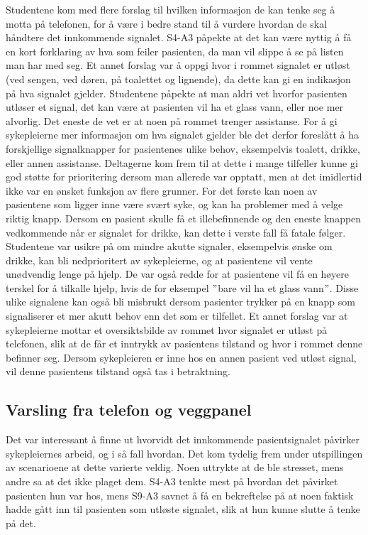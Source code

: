 \noindent
Studentene kom med flere forslag til hvilken informasjon de kan tenke seg å motta på telefonen, for å være i bedre stand til å vurdere hvordan de skal håndtere det innkommende signalet. S4-A3 påpekte at det kan være nyttig å få en kort forklaring av hva som feiler pasienten, da man vil slippe å se på listen man har med seg. Et annet forslag var å oppgi hvor i rommet signalet er utløst (ved sengen, ved døren, på toalettet og lignende), da dette kan gi en indikasjon på hva signalet gjelder. Studentene påpekte at man aldri vet hvorfor pasienten utløser et signal, det kan være at pasienten vil ha et glass vann, eller noe mer alvorlig. Det eneste de vet er at noen på rommet trenger assistanse. For å gi sykepleierne mer informasjon om hva signalet gjelder ble det derfor foreslått å ha forskjellige signalknapper for pasientenes ulike behov, eksempelvis toalett, drikke, eller annen assistanse. Deltagerne kom  frem til at dette i mange tilfeller kunne gi god støtte for prioritering dersom man allerede var opptatt, men at det imidlertid ikke var en ønsket funksjon av flere grunner. For det første kan noen av pasientene som ligger inne være svært syke, og kan ha problemer med å velge riktig knapp. Dersom en pasient skulle få et illebefinnende og den eneste knappen vedkommende når er signalet for drikke, kan dette i verste fall få fatale følger. Studentene var usikre på om mindre akutte signaler, eksempelvis ønske om drikke, kan bli nedprioritert av sykepleierne, og at pasientene vil  vente unødvendig lenge på hjelp. De var også redde for at pasientene vil få en høyere terskel for å tilkalle hjelp, hvis de for eksempel $"$bare vil ha et glass vann$"$. Disse ulike signalene kan også bli misbrukt dersom pasienter trykker på en knapp som signaliserer et mer akutt behov enn det som er tilfellet. Et annet forslag var at sykepleierne mottar et oversiktsbilde av rommet hvor signalet er utløst på telefonen, slik at de får et inntrykk av pasientens tilstand og hvor i rommet denne befinner seg. Dersom sykepleieren er inne hos en annen pasient ved utløst signal, vil denne pasientens tilstand også tas i betraktning. 

\subsection{Varsling fra telefon og veggpanel}
Det var interessant å finne ut hvorvidt det innkommende pasientsignalet påvirker sykepleiernes arbeid, og i så fall hvordan. Det kom tydelig frem under utspillingen av scenarioene at dette varierte veldig. Noen uttrykte at de ble stresset, mens andre sa at det ikke plaget dem. S4-A3 tenkte mest på hvordan det påvirket pasienten hun var hos, mens S9-A3 savnet å få en bekreftelse på at noen faktisk hadde gått inn til pasienten som utløste signalet, slik at hun kunne slutte å tenke på det. 

